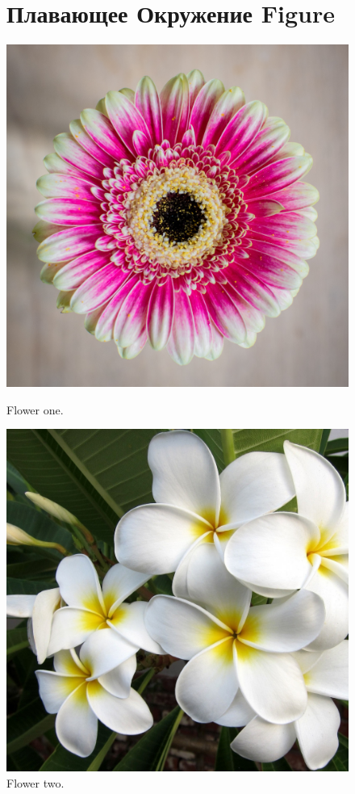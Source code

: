 \begin{figure}[t!]
\section{Плавающее Окружение Figure}
\centering
  \begin{minipage}[b]{0.4\textwidth}
    \includegraphics[width=\textwidth]{images/flower1.jpg}
    \caption{Flower one.}
    \label{fig:flower1}
  \end{minipage}
  \hfill
  \begin{minipage}[b]{0.4\textwidth}
    \includegraphics[width=\textwidth]{images/flower2.jpg}
    \caption{Flower two.}
    \label{fig:flower2}
  \end{minipage}
\end{figure}

